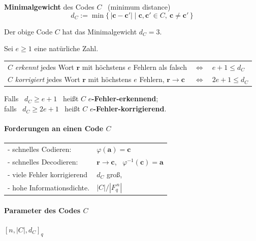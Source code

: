 \begin{definition}[Minimalgewicht]
\textbf{Minimalgewicht} des Codes $C$ \ (minimum distance)
\[ d_C := \min\{\, |\mathbf{c} - \mathbf{c}'| \mid \mathbf{c}, \mathbf{c}' \in C,\ \mathbf{c} \neq \mathbf{c}' \,\} \]
\end{definition}

\begin{beispiel}
Der obige Code $C$ hat das Minimalgewicht $d_C = 3$.
\end{beispiel}

\begin{satz}
Sei $e \geq 1$ eine natürliche Zahl.\\
\begin{tabular}{lcl}
$C$ \textit{erkennt} jedes Wort $\mathbf{r}$ mit höchstens $e$ Fehlern als falsch & $\Leftrightarrow$ & $e + 1 \leq d_C$ \\
$C$ \textit{korrigiert} jedes Wort $\mathbf{r}$ mit höchstens $e$ Fehlern, $\mathbf{r} \to \mathbf{c}$ & $\Leftrightarrow$ & $2e + 1 \leq d_C$ \\
\end{tabular}
\end{satz}

\begin{definition}
Falls \ $d_C \geq e + 1$ \ heißt $C$ \textbf{$e$-Fehler-erkennend};\\
falls \ $d_C \geq 2e + 1$ \ heißt $C$ \textbf{$e$-Fehler-korrigierend}.
\end{definition}

\paragraph{Forderungen an einen Code $C$}
\begin{tabular}{ll}
- schnelles Codieren: & $\varphi(\mathbf{a}) = \mathbf{c}$ \\
- schnelles Decodieren: & $\mathbf{r} \to \mathbf{c}$, \ $\varphi^{-1}(\mathbf{c}) = \mathbf{a}$ \\
- viele Fehler korrigierend & $d_C$ groß, \\
- hohe Informationsdichte. & $|C| / |F_q^{\,n}|$ \\
\end{tabular}

\paragraph{Parameter des Codes $C$} \qquad $[n, |C|, d_C]_q$

